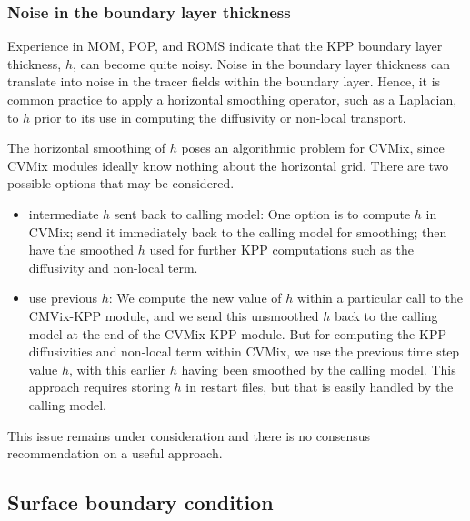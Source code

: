 \subsubsection{Noise in the boundary layer thickness}

Experience in MOM, POP, and ROMS indicate that the KPP boundary layer
thickness, $h$, can become quite noisy.  Noise in the boundary layer
thickness can translate into noise in the tracer fields within the
boundary layer.  Hence, it is common practice to apply a horizontal
smoothing operator, such as a Laplacian, to $h$ prior to its use in
computing the diffusivity or non-local transport.

The horizontal smoothing of $h$ poses an algorithmic problem for
CVMix, since CVMix modules ideally know nothing about the horizontal
grid.  There are two possible options that may be considered.
\begin{itemize}

\item {\sc intermediate $h$ sent back to calling model}: One option is
  to compute $h$ in CVMix; send it immediately back to the
  calling model for smoothing; then have the smoothed $h$ used for
  further KPP computations such as the diffusivity and non-local
  term.  

\item {\sc use previous $h$}: We compute the new value of $h$ within a
  particular call to the CMVix-KPP module, and we send this unsmoothed
  $h$ back to the calling model at the end of the CVMix-KPP module.
  But for computing the KPP diffusivities and non-local term within
  CVMix, we use the previous time step value $h$, with this earlier $h$
  having been smoothed by the calling model.  This approach requires
  storing $h$ in restart files, but that is easily handled by the
  calling model.  

\end{itemize}

This issue remains under consideration and there is no consensus
recommendation on a useful approach.


\subsection{Surface boundary condition}
\label{subsection:kpp-surface-boundary-condition}


